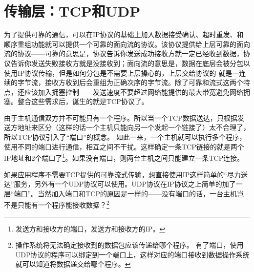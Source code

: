 \section{传输层：TCP和UDP}
为了提供可靠的通信，可以在IP协议的基础上加入数据接受确认、超时重发、和顺序重组功能就可以提供一个可靠的面向流的协议。该协议提供给上层可靠的面向流的协议——可靠的意思是，协议告诉你发送成功接收方就一定已经收到数据，协议告诉你发送失败接收方就是没接收到；面向流的意思是，数据在底层会被分包以使用IP协议传输，但是如何分包是不需要上层操心的，上层交给协议的 就是一连续的字节流，接收方收到后会重组为正确次序的字节流。除了可靠和流式这两个特点，还应该加入拥塞控制——发送速度不要超过网络能提供的最大带宽避免网络拥塞。整合这些需求后，诞生的就是TCP协议了。

由于主机通信双方并不可能只有一个程序。所以当一个TCP数据送达，只根据发送方地址来区分（这样的话一个主机只能向另一个发起一个链接了）太不合理了，所以TCP协议引入了“端口”的概念。
如此一来，一个主机就可以执行多个程序，使用不同的端口进行通信，相互之间不干扰。这样确定一条TCP链接的就是两个IP地址和2个端口了\footnote{发送方和接收方的端口，发送方和接收方的IP。}。如果没有端口，则两台主机之间只能建立一条TCP连接。

如果应用程序不需要TCP提供的可靠流式传输，想直接使用IP这样简单的“尽力送达”服务，另外有一个UDP协议可以使用。UDP协议在IP协议之上简单的加了一层“端口”。当然加入端口和TCP的原因是一样的——没有端口的话，一台主机岂不是只能有一个程序能接收数据？\footnote{操作系统将无法确定接收到的数据包应该传递给哪个程序。
有了端口，使用UDP协议的程序可以绑定到一个端口上，这样对应的端口接收到数据操作系统就可以知道将数据递交给哪个程序。}


